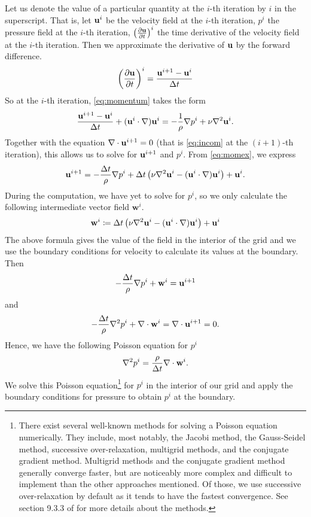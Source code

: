 \documentclass[11pt,a4paper,twoside,openright]{report}
\begin{document}
Let us denote the value of a particular quantity at the $i$-th iteration by $i$ in the superscript. That is, let $\mathbf u^i$ be the velocity field at the $i$-th iteration, $p^i$ the pressure field at the $i$-th iteration, $\left(\frac{\partial \mathbf u}{\partial t}\right)^i$ the time derivative of the velocity field at the $i$-th iteration. Then we approximate the derivative of $\mathbf u$ by the forward difference.
\begin{align*}
	\left(\frac{\partial \mathbf u}{\partial t}\right)^i=\frac{\mathbf u^{i+1}-\mathbf u^i}{\Delta t}
\end{align*}
So at the $i$-th iteration, \eqref{eq:momentum} takes the form
\begin{align}\label{eq:momex}
	\frac{\mathbf u^{i+1}-\mathbf u^i}{\Delta t}+(\mathbf u^i\cdot\nabla)\mathbf u^i=-\frac1\rho\nabla p^i+\nu\nabla^2\mathbf u^i.
\end{align}
Together with the equation $\nabla\cdot\mathbf u^{i+1}=0$ (that is \eqref{eq:incom} at the $(i+1)$-th iteration), this allows us to solve for $\mathbf u^{i+1}$ and $p^i$. From \eqref{eq:momex}, we express
\newcommand{\ww}{\mathbf w}
\begin{align*}
	\mathbf u^{i+1}=-\frac{\Delta t}\rho\nabla p^i+\Delta t\left(\nu\nabla^2\mathbf u^i-(\mathbf u^i\cdot\nabla)\mathbf u^i\right)+\mathbf u^i.
\end{align*}
During the computation, we have yet to solve for $p^i$, so we only calculate the following intermediate vector field $\ww^i$.
\begin{align*}
	\ww^i\coloneqq\dt\left(\nu\nabla^2\uu^i-(\uu^i\cdot\nabla)\uu^i\right)+\uu^i
\end{align*}
The above formula gives the value of the field in the interior of the grid and we use the boundary conditions for velocity to calculate its values at the boundary. Then
\begin{align*}
	-\frac\dt\rho\nabla p^i+\ww^i=\uu^{i+1}
\end{align*}
and
\begin{align*}
	-\frac\dt\rho\nabla^2p^i+\nabla\cdot\ww^i=\nabla\cdot\uu^{i+1}=0.
\end{align*}
Hence, we have the following Poisson equation for $p^i$
\begin{align*}
	\nabla^2p^i=\frac\rho\dt\nabla\cdot\ww^i.
\end{align*}
We solve this Poisson equation\footnote{There exist several well-known methods for solving a Poisson equation numerically. They include, most notably, the Jacobi method, the Gauss-Seidel method, successive over-relaxation, multigrid methods, and the conjugate gradient method. Multigrid methods and the conjugate gradient method generally converge faster, but are noticeably more complex and difficult to implement than the other approaches mentioned. Of those, we use successive over-relaxation by default as it tends to have the fastest convergence. See section 9.3.3 of \cite{Epperson} for more details about the methods.} for $p^i$ in the interior of our grid and apply the boundary conditions for pressure to obtain $p^i$ at the boundary.
\end{document}

